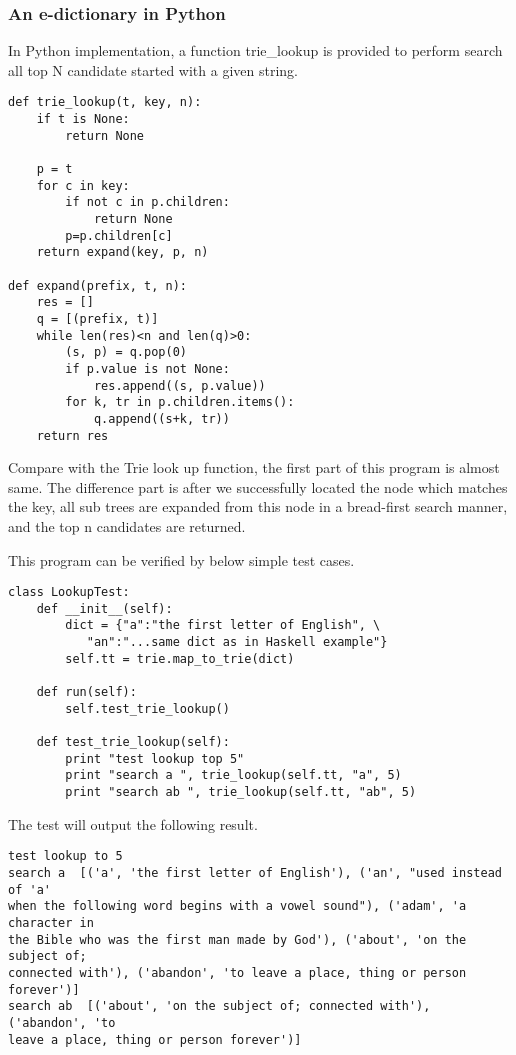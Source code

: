 \documentclass{article}
\begin{document}
\subsubsection*{An e-dictionary in Python}
In Python implementation, a function trie\_lookup is provided to perform
search all top N candidate started with a given string.

\lstset{language=Python}
\begin{lstlisting}
def trie_lookup(t, key, n):
    if t is None:
        return None

    p = t
    for c in key:
        if not c in p.children:
            return None
        p=p.children[c]
    return expand(key, p, n)

def expand(prefix, t, n):
    res = []
    q = [(prefix, t)]
    while len(res)<n and len(q)>0:
        (s, p) = q.pop(0)
        if p.value is not None:
            res.append((s, p.value))
        for k, tr in p.children.items():
            q.append((s+k, tr))
    return res
\end{lstlisting}

Compare with the Trie look up function, the first part of this program is almost
same. The difference part is after we successfully located the node
which matches the key, all sub trees are expanded from this node in a 
bread-first search manner, and the top n candidates are returned. 

This program can be verified by below simple test cases.

\begin{lstlisting}
class LookupTest:
    def __init__(self):
        dict = {"a":"the first letter of English", \
           "an":"...same dict as in Haskell example"}
        self.tt = trie.map_to_trie(dict)

    def run(self):
        self.test_trie_lookup()

    def test_trie_lookup(self):
        print "test lookup top 5"
        print "search a ", trie_lookup(self.tt, "a", 5)
        print "search ab ", trie_lookup(self.tt, "ab", 5)
\end{lstlisting}

The test will output the following result.

\begin{verbatim}
test lookup to 5
search a  [('a', 'the first letter of English'), ('an', "used instead of 'a' 
when the following word begins with a vowel sound"), ('adam', 'a character in 
the Bible who was the first man made by God'), ('about', 'on the subject of; 
connected with'), ('abandon', 'to leave a place, thing or person forever')]
search ab  [('about', 'on the subject of; connected with'), ('abandon', 'to 
leave a place, thing or person forever')]
\end{verbatim}
\end{document}
